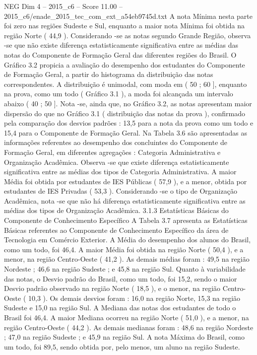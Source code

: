 \begin{textsample}{NEG Dim 4 – 2015\_c6 – Score 11.00 – 2015\_c6/enade\_2015\_tec\_com\_ext\_a54eb9745d.txt}
A nota Mínima nesta parte foi zero nas regiões Sudeste e Sul, enquanto a maior nota Mínima foi obtida na região Norte ( 44,9 ).
Considerando -se as notas segundo Grande Região, observa -se que não existe diferença estatisticamente significativa entre as médias das notas do Componente de Formação Geral das diferentes regiões do Brasil.
O Gráfico 3.2 propicia a avaliação do desempenho dos estudantes do Componente de Formação Geral, a partir do histograma da distribuição das notas correspondentes.
A distribuição é unimodal, com moda em ( 50 ; 60 ], enquanto na prova, como um todo ( Gráfico 3.1 ), a moda foi alcançada um intervalo abaixo ( 40 ; 50 ].
Nota -se, ainda que, no Gráfico 3.2, as notas apresentam maior dispersão do que no Gráfico 3.1 ( distribuição das notas da prova ), confirmado pela comparação dos desvios padrões : 13,5 para a nota da prova como um todo e 15,4 para o Componente de Formação Geral.
Na Tabela 3.6 são apresentadas as informações referentes ao desempenho dos concluintes do Componente de Formação Geral, em diferentes agregações : Categoria Administrativa e Organização Acadêmica.
Observa -se que existe diferença estatisticamente significativa entre as médias dos tipos de Categoria Administrativa.
A maior Média foi obtida por estudantes de IES Públicas ( 57,9 ), e a menor, obtida por estudantes de IES Privadas ( 53,3 ).
Considerando -se o tipo de Organização Acadêmica, nota -se que não há diferença estatisticamente significativa entre as médias dos tipos de Organização Acadêmica. 3.1.3 Estatísticas Básicas do Componente de Conhecimento Específico A Tabela 3.7 apresenta as Estatísticas Básicas referentes ao Componente de Conhecimento Específico da área de Tecnologia em Comércio Exterior.
A Média do desempenho dos alunos do Brasil, como um todo, foi 46,4.
A maior Média foi obtida na região Norte ( 50,4 ), e a menor, na região Centro-Oeste ( 41,2 ).
As demais médias foram : 49,5 na região Nordeste ; 46,6 na região Sudeste ; e 45,8 na região Sul.
Quanto à variabilidade das notas, o Desvio padrão do Brasil, como um todo, foi 15,2, sendo o maior Desvio padrão observado na região Norte ( 18,5 ), e o menor, na região Centro-Oeste ( 10,3 ).
Os demais desvios foram : 16,0 na região Norte, 15,3 na região Sudeste e 15,0 na região Sul.
A Mediana das notas dos estudantes de todo o Brasil foi 46,4.
A maior Mediana ocorreu na região Norte ( 51,0 ), e a menor, na região Centro-Oeste ( 44,2 ).
As demais medianas foram : 48,6 na região Nordeste ; 47,0 na região Sudeste ; e 45,9 na região Sul.
A nota Máxima do Brasil, como um todo, foi 89,5, sendo obtida por, pelo menos, um aluno na região Sudeste.

\end{textsample}
